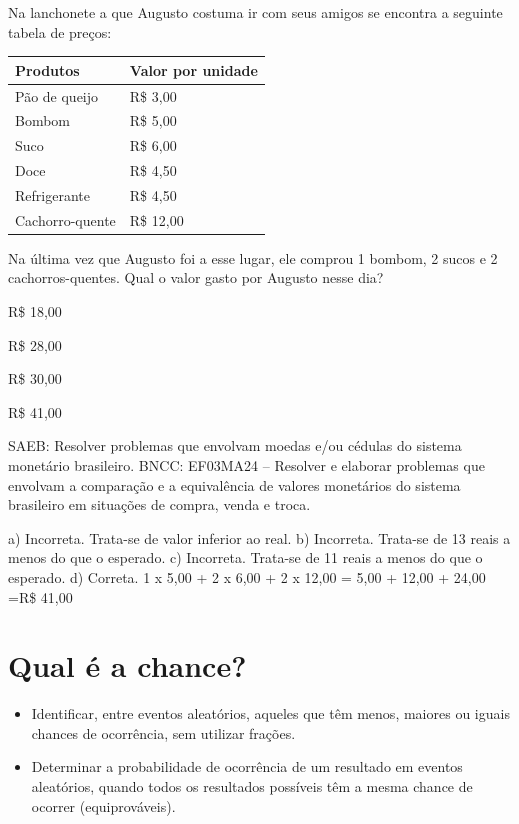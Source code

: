 {\begin{escolha}
Na lanchonete a que Augusto costuma ir com seus amigos se encontra a
seguinte tabela de preços:

\begin{longtable}[]{@{}ll@{}}
\toprule
Produtos & Valor por unidade\tabularnewline
\midrule
\endhead
Pão de queijo & R\$ 3,00\tabularnewline
Bombom & R\$ 5,00\tabularnewline
Suco & R\$ 6,00\tabularnewline
Doce & R\$ 4,50\tabularnewline
Refrigerante & R\$ 4,50\tabularnewline
Cachorro-quente & R\$ 12,00\tabularnewline
\bottomrule
\end{longtable}

Na última vez que Augusto foi a esse lugar, ele comprou 1 bombom, 2
sucos e 2 cachorros-quentes. Qual o valor gasto por Augusto nesse dia?

\begin{escolha}

\item
  R\$ 18,00
\item
  R\$ 28,00
\item
  R\$ 30,00
\item
  R\$ 41,00
\end{escolha}

SAEB: Resolver problemas que envolvam moedas e/ou cédulas do sistema monetário brasileiro. 
BNCC: EF03MA24 -- Resolver e elaborar problemas que envolvam a comparação e a equivalência de
valores monetários do sistema brasileiro em situações de compra, venda e troca.

a) Incorreta. Trata-se de valor inferior ao real.
b) Incorreta. Trata-se de 13 reais a menos do que o esperado.
c) Incorreta. Trata-se de 11 reais a menos do que o esperado.
d) Correta.
1 x 5,00 + 2 x 6,00 + 2 x 12,00 = 5,00 + 12,00 + 24,00 =R\$ 41,00


\chapter{Qual é a chance?}


\begin{itemize}
    \item Identificar, entre eventos aleatórios, aqueles que têm menos, maiores ou
iguais chances de ocorrência, sem utilizar frações.

    \item Determinar a probabilidade de ocorrência de um resultado em eventos
aleatórios, quando todos os resultados possíveis têm a mesma chance de
ocorrer (equiprováveis).
\end{itemize}


\end{escolha}}
